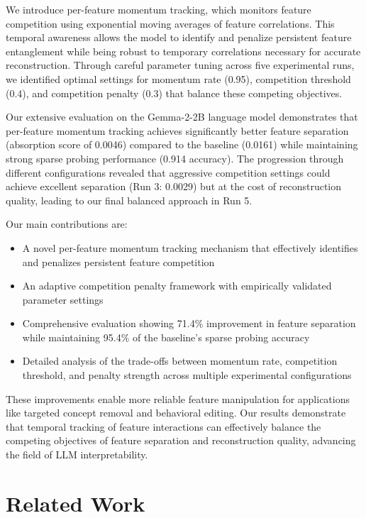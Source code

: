 \documentclass{article} %
\begin{document}
We introduce per-feature momentum tracking, which monitors feature competition using exponential moving averages of feature correlations. This temporal awareness allows the model to identify and penalize persistent feature entanglement while being robust to temporary correlations necessary for accurate reconstruction. Through careful parameter tuning across five experimental runs, we identified optimal settings for momentum rate (0.95), competition threshold (0.4), and competition penalty (0.3) that balance these competing objectives.

Our extensive evaluation on the Gemma-2-2B language model demonstrates that per-feature momentum tracking achieves significantly better feature separation (absorption score of 0.0046) compared to the baseline (0.0161) while maintaining strong sparse probing performance (0.914 accuracy). The progression through different configurations revealed that aggressive competition settings could achieve excellent separation (Run 3: 0.0029) but at the cost of reconstruction quality, leading to our final balanced approach in Run 5.

Our main contributions are:
\begin{itemize}
    \item A novel per-feature momentum tracking mechanism that effectively identifies and penalizes persistent feature competition
    \item An adaptive competition penalty framework with empirically validated parameter settings
    \item Comprehensive evaluation showing 71.4\% improvement in feature separation while maintaining 95.4\% of the baseline's sparse probing accuracy
    \item Detailed analysis of the trade-offs between momentum rate, competition threshold, and penalty strength across multiple experimental configurations
\end{itemize}

These improvements enable more reliable feature manipulation for applications like targeted concept removal and behavioral editing. Our results demonstrate that temporal tracking of feature interactions can effectively balance the competing objectives of feature separation and reconstruction quality, advancing the field of LLM interpretability.

\section{Related Work}
\label{sec:related}
\end{document}
